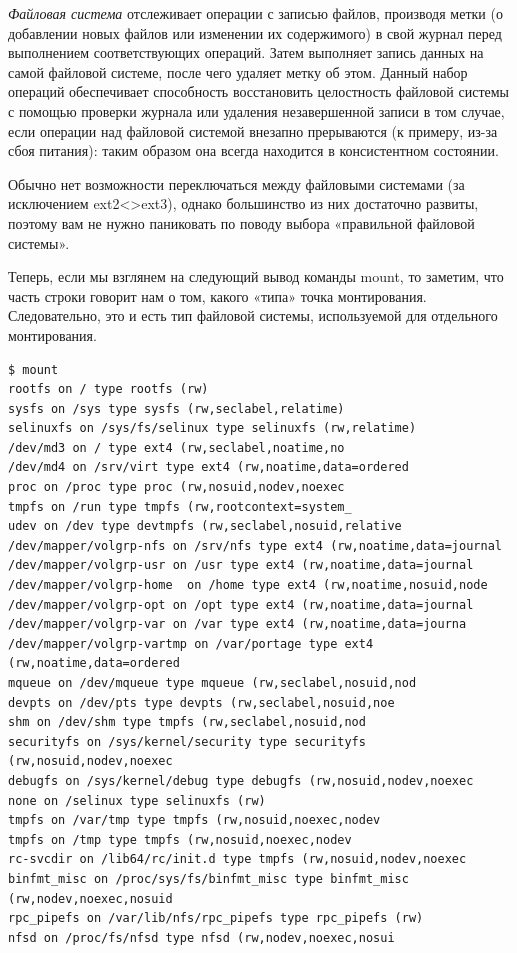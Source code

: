 \documentclass[10pt]{book}
\begin{document}
\textit{Файловая система} отслеживает операции с записью файлов, производя метки (о добавлении новых файлов или изменении их содержимого) в свой журнал перед выполнением соответствующих операций. Затем выполняет запись данных на самой файловой системе, после чего удаляет метку об этом. Данный набор операций обеспечивает способность восстановить целостность файловой системы с помощью проверки журнала или удаления незавершенной записи в том случае, если операции над файловой системой внезапно прерываются (к примеру, из-за сбоя питания): таким образом она всегда находится в консистентном состоянии.

Обычно нет возможности переключаться между файловыми системами (за исключением ext2<>ext3), однако большинство из них достаточно развиты, поэтому вам не нужно паниковать по поводу выбора «правильной файловой системы».

Теперь, если мы взглянем на следующий вывод команды mount, то заметим, что часть строки говорит нам о том, какого «типа» точка монтирования. Следовательно, это и есть тип файловой системы, используемой для отдельного монтирования.

\vspace{3mm}
\begin{tcolorbox}
\begin{lstlisting}
$ mount
rootfs on / type rootfs (rw) 
sysfs on /sys type sysfs (rw,seclabel,relatime)
selinuxfs on /sys/fs/selinux type selinuxfs (rw,relatime) 
/dev/md3 on / type ext4 (rw,seclabel,noatime,no 
/dev/md4 on /srv/virt type ext4 (rw,noatime,data=ordered
proc on /proc type proc (rw,nosuid,nodev,noexec 
tmpfs on /run type tmpfs (rw,rootcontext=system_
udev on /dev type devtmpfs (rw,seclabel,nosuid,relative 
/dev/mapper/volgrp-nfs on /srv/nfs type ext4 (rw,noatime,data=journal
/dev/mapper/volgrp-usr on /usr type ext4 (rw,noatime,data=journal 
/dev/mapper/volgrp-home  on /home type ext4 (rw,noatime,nosuid,node
/dev/mapper/volgrp-opt on /opt type ext4 (rw,noatime,data=journal
/dev/mapper/volgrp-var on /var type ext4 (rw,noatime,data=journa
/dev/mapper/volgrp-vartmp on /var/portage type ext4 (rw,noatime,data=ordered
mqueue on /dev/mqueue type mqueue (rw,seclabel,nosuid,nod 
devpts on /dev/pts type devpts (rw,seclabel,nosuid,noe
shm on /dev/shm type tmpfs (rw,seclabel,nosuid,nod
securityfs on /sys/kernel/security type securityfs (rw,nosuid,nodev,noexec
debugfs on /sys/kernel/debug type debugfs (rw,nosuid,nodev,noexec
none on /selinux type selinuxfs (rw) 
tmpfs on /var/tmp type tmpfs (rw,nosuid,noexec,nodev 
tmpfs on /tmp type tmpfs (rw,nosuid,noexec,nodev
rc-svcdir on /lib64/rc/init.d type tmpfs (rw,nosuid,nodev,noexec 
binfmt_misc on /proc/sys/fs/binfmt_misc type binfmt_misc (rw,nodev,noexec,nosuid 
rpc_pipefs on /var/lib/nfs/rpc_pipefs type rpc_pipefs (rw)
nfsd on /proc/fs/nfsd type nfsd (rw,nodev,noexec,nosui
\end{lstlisting}
\end{tcolorbox}
\end{document}
